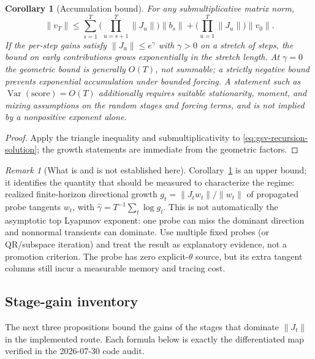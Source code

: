 \documentclass[11pt]{article}
\newtheorem{corollary}[proposition]{Corollary}
\theoremstyle{definition}
\theoremstyle{remark}
\newtheorem{remark}[proposition]{Remark}
\begin{document}
\begin{corollary}[Accumulation bound]
\label{cor:gsv-accumulation}
For any submultiplicative matrix norm,
\begin{equation}
\label{eq:gsv-accumulation}
 \lVert v_T\rVert
 \le \sum_{s=1}^{T}\Big(\prod_{u=s+1}^{T}\lVert J_u\rVert\Big)
 \lVert b_s\rVert
 +\Big(\prod_{u=1}^{T}\lVert J_u\rVert\Big)\lVert v_0\rVert .
\end{equation}
If the per-step gains satisfy $\lVert J_u\rVert\le e^{\gamma}$ with
$\gamma>0$ on a stretch of steps, the bound on early contributions grows
exponentially in the stretch length.  At $\gamma=0$ the geometric bound is
generally $O(T)$, not summable; a strictly negative bound prevents exponential
accumulation under bounded forcing.  A statement such as
$\operatorname{Var}(\mathrm{score})=O(T)$ additionally requires suitable
stationarity, moment, and mixing assumptions on the random stages and forcing
terms, and is not implied by a nonpositive exponent alone.
\end{corollary}

\begin{proof}
Apply the triangle inequality and submultiplicativity to
\eqref{eq:gsv-recursion-solution}; the growth statements are immediate from
the geometric factors.
\end{proof}

\begin{remark}[What is and is not established here]
\label{rem:gsv-lyapunov}
Corollary~\ref{cor:gsv-accumulation} is an upper bound; it identifies the
quantity that should be measured to characterize the regime: realized
finite-horizon directional growth
$g_t=\lVert J_t w_t\rVert/\lVert w_t\rVert$ of propagated probe tangents
$w_t$, with $\widehat\gamma = T^{-1}\sum_t\log g_t$.  This is not
automatically the asymptotic top Lyapunov exponent: one probe can miss the
dominant direction and nonnormal transients can dominate.  Use multiple fixed
probes (or QR/subspace iteration) and treat the result as explanatory evidence,
not a promotion criterion.  The probe has zero explicit-$\theta$ source, but
its extra tangent columns still incur a measurable memory and tracing cost.
\end{remark}

\subsection{Stage-gain inventory}

The next three propositions bound the gains of the stages that dominate
$\lVert J_t\rVert$ in the implemented route.  Each formula below is exactly
the differentiated map verified in the 2026-07-30 code audit.
\end{document}

